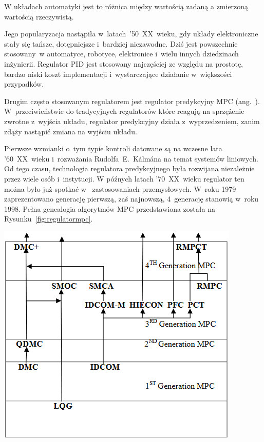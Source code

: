 \begin{Definition}\label{def:blad}
  W układach automatyki jest to różnica między wartością zadaną a zmierzoną wartością rzeczywistą.
\end{Definition}

Jego popularyzacja nastąpiła w~latach~'50~XX~wieku, gdy układy elektroniczne stały się tańsze, dotępniejsze i~bardziej niezawodne. Dziś jest powszechnie stosowany~w automatyce, robotyce, elektronice i~wielu innych dziedzinach inżynierii. Regulator PID jest stosowany najczęściej ze względu na prostotę, bardzo niski koszt implementacji i~wystarczające działanie w~większości przypadków.

Drugim często stosowanym regulatorem jest regulator predykcyjny MPC (ang.~). W~przeciwieństwie do tradycyjnych regulatorów które reagują na sprzężenie zwrotne z~wyjścia układu, regulator predykcyjny działa z~wyprzedzeniem, zanim zdąży nastąpić zmiana na wyjściu układu. 

Pierwsze wzmianki o~tym typie kontroli datowane są na wczesne lata '60~XX~wieku i~rozważania Rudolfa~E.~Kálmána na temat systemów liniowych. Od tego czasu, technologia regulatora predykcyjnego była rozwijana niezależnie przez wiele osób i~instytucji. W późnych latach '70~XX~wieku regulator ten można było już spotkać w ~zastosowaniach przemysłowych. W~roku 1979 zaprezentowano generację pierwszą, zaś najnowszą, 4~generację stanowią w~roku 1998\cite{bib:regulatormpc}. Pełna genealogia algorytmów MPC przedstawiona została na Rysunku~\ref{fig:regulatormpc}.

\begin{center}
  \includegraphics[scale=0.8]{images/drzewompc.png}
  \label{fig:regulatormpc}
\end{center}

